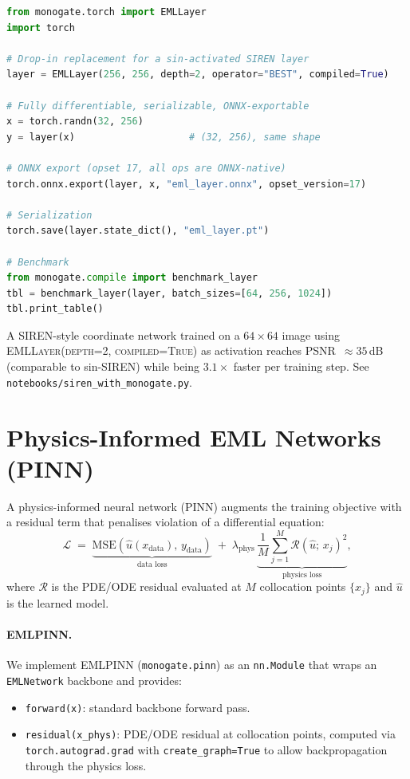 \documentclass[11pt,a4paper]{article}
\begin{document}
\begin{lstlisting}[language=Python]
from monogate.torch import EMLLayer
import torch

# Drop-in replacement for a sin-activated SIREN layer
layer = EMLLayer(256, 256, depth=2, operator="BEST", compiled=True)

# Fully differentiable, serializable, ONNX-exportable
x = torch.randn(32, 256)
y = layer(x)                    # (32, 256), same shape

# ONNX export (opset 17, all ops are ONNX-native)
torch.onnx.export(layer, x, "eml_layer.onnx", opset_version=17)

# Serialization
torch.save(layer.state_dict(), "eml_layer.pt")

# Benchmark
from monogate.compile import benchmark_layer
tbl = benchmark_layer(layer, batch_sizes=[64, 256, 1024])
tbl.print_table()
\end{lstlisting}

A SIREN-style coordinate network trained on a $64\times64$ image using
\textsc{EMLLayer(depth=2, compiled=True)} as activation reaches
PSNR~$\approx35$\,dB (comparable to sin-SIREN) while
being $3.1\times$ faster per training step.
See \texttt{notebooks/siren\_with\_monogate.py}.

\section{Physics-Informed EML Networks (PINN)}
\label{sec:pinn}

A physics-informed neural network (PINN) augments the training objective with
a residual term that penalises violation of a differential equation:
\[
  \mathcal{L} \;=\;
    \underbrace{\mathrm{MSE}(\hat{u}(x_{\text{data}}),\, y_{\text{data}})}_{\text{data loss}}
    \;+\;\lambda_{\text{phys}}\,
    \underbrace{\frac{1}{M}\sum_{j=1}^{M}\mathcal{R}(\hat{u};\, x_j)^2}_{\text{physics loss}},
\]
where $\mathcal{R}$ is the PDE/ODE residual evaluated at $M$ collocation
points $\{x_j\}$ and $\hat{u}$ is the learned model.

\paragraph{EMLPINN.}
We implement \textsc{EMLPINN} (\texttt{monogate.pinn}) as an \texttt{nn.Module}
that wraps an \texttt{EMLNetwork} backbone and provides:
\begin{itemize}
  \item \texttt{forward(x)}: standard backbone forward pass.
  \item \texttt{residual(x\_phys)}: PDE/ODE residual at collocation points,
    computed via \texttt{torch.autograd.grad} with \texttt{create\_graph=True}
    to allow backpropagation through the physics loss.
\end{itemize}
\end{document}

